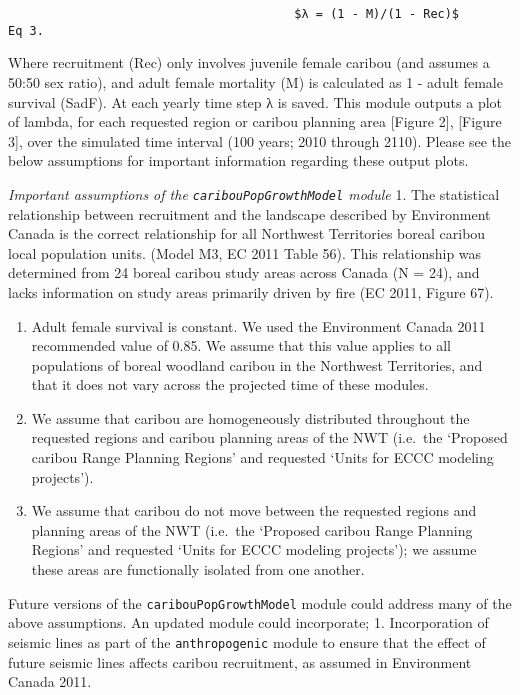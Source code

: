 \documentclass[]{article}
\begin{document}
\begin{verbatim}
                                        $λ = (1 - M)/(1 - Rec)$                 Eq 3.
\end{verbatim}

Where recruitment (Rec) only involves juvenile female caribou (and
assumes a 50:50 sex ratio), and adult female mortality (M) is calculated
as 1 - adult female survival (SadF). At each yearly time step λ is
saved. This module outputs a plot of lambda, for each requested region
or caribou planning area {[}Figure 2{]}, {[}Figure 3{]}, over the
simulated time interval (100 years; 2010 through 2110). Please see the
below assumptions for important information regarding these output
plots.

\emph{Important assumptions of the \texttt{caribouPopGrowthModel}
module} 1. The statistical relationship between recruitment and the
landscape described by Environment Canada is the correct relationship
for all Northwest Territories boreal caribou local population units.
(Model M3, EC 2011 Table 56). This relationship was determined from 24
boreal caribou study areas across Canada (N = 24), and lacks information
on study areas primarily driven by fire (EC 2011, Figure 67).

\begin{enumerate}
\def\labelenumi{\arabic{enumi}.}
\setcounter{enumi}{1}
\item
  Adult female survival is constant. We used the Environment Canada 2011
  recommended value of 0.85. We assume that this value applies to all
  populations of boreal woodland caribou in the Northwest Territories,
  and that it does not vary across the projected time of these modules.
\item
  We assume that caribou are homogeneously distributed throughout the
  requested regions and caribou planning areas of the NWT (i.e.~the
  `Proposed caribou Range Planning Regions' and requested `Units for
  ECCC modeling projects').
\item
  We assume that caribou do not move between the requested regions and
  planning areas of the NWT (i.e.~the `Proposed caribou Range Planning
  Regions' and requested `Units for ECCC modeling projects'); we assume
  these areas are functionally isolated from one another.
\end{enumerate}

Future versions of the \texttt{caribouPopGrowthModel} module could
address many of the above assumptions. An updated module could
incorporate; 1. Incorporation of seismic lines as part of the
\texttt{anthropogenic} module to ensure that the effect of future
seismic lines affects caribou recruitment, as assumed in Environment
Canada 2011.
\end{document}
